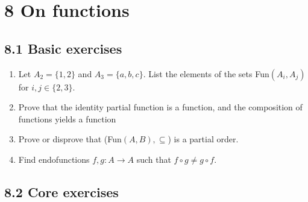 \documentclass[10pt,\jkfside,a4paper]{article}
\begin{document}
\section*{8 On functions}

\subsection*{8.1 Basic exercises}

\begin{enumerate}

\item Let $A_2 = \{1, 2\}$ and $A_3 = \{a, b, c\}$. List the elements of the sets 
Fun$(A_i, A_j)$ for $i, j \in \{2, 3\}$.



\item Prove that the identity partial function is a function, and the composition of functions 
yields a function



\item Prove or disprove that (Fun$(A, B), \subseteq$) is a partial order.



\item Find endofunctions $f, g: A \rightarrow A$ such that $f \circ g \neq g \circ f$.



\end{enumerate}

\subsection*{8.2 Core exercises}
\end{document}
